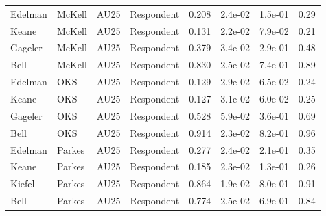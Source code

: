 \documentclass{monashthesis}
\begin{document}
\begin{center}
\begin{longtable}{llllllll}
Edelman & McKell & AU25 & Respondent & 0.208 & 2.4e-02 & 1.5e-01 & 0.29 \\
Keane & McKell & AU25 & Respondent & 0.131 & 2.2e-02 & 7.9e-02 & 0.21 \\
Gageler & McKell & AU25 & Respondent & 0.379 & 3.4e-02 & 2.9e-01 & 0.48 \\
Bell & McKell & AU25 & Respondent & 0.830 & 2.5e-02 & 7.4e-01 & 0.89 \\
Edelman & OKS & AU25 & Respondent & 0.129 & 2.9e-02 & 6.5e-02 & 0.24 \\
Keane & OKS & AU25 & Respondent & 0.127 & 3.1e-02 & 6.0e-02 & 0.25 \\
Gageler & OKS & AU25 & Respondent & 0.528 & 5.9e-02 & 3.6e-01 & 0.69 \\
Bell & OKS & AU25 & Respondent & 0.914 & 2.3e-02 & 8.2e-01 & 0.96 \\
Edelman & Parkes & AU25 & Respondent & 0.277 & 2.4e-02 & 2.1e-01 & 0.35 \\
Keane & Parkes & AU25 & Respondent & 0.185 & 2.3e-02 & 1.3e-01 & 0.26 \\
Kiefel & Parkes & AU25 & Respondent & 0.864 & 1.9e-02 & 8.0e-01 & 0.91 \\
Bell & Parkes & AU25 & Respondent & 0.774 & 2.5e-02 & 6.9e-01 & 0.84 \\
\end{longtable}
\end{center}
\end{document}
